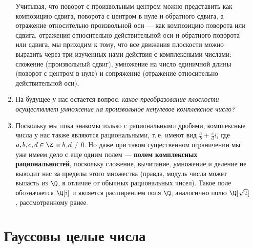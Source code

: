 \begin{enumerate}
Учитывая, что поворот с произвольным центром можно представить как композицию сдвига, поворота с центром в нуле и обратного сдвига, а отражение относительно произвольной оси --- как композицию поворота или сдвига, отражения относительно действительной оси и обратного поворота или сдвига, мы приходим к тому, что все движения плоскости можно выразить через три изученных нами действия с комплексными числами: сложение (произвольный сдвиг), умножение на число единичной длины (поворот с центром в нуле) и сопряжение (отражение относительно действительной оси).
\item На будущее у нас остается вопрос: \textit{какое преобразование плоскости осуществляет умножение на произвольное ненулевое комплексное число?}
\item Поскольку мы пока знакомы только с рациональными дробями, комплексные числа у нас также являются рациональными, т.\,е. имеют вид $\frac{a}{b}+\frac{c}{d}i$, где $a,b,c,d\in\Z$ и $b,d\ne 0$. Но даже при таком существенном ограничении мы уже имеем дело с еще одним полем --- \textbf{полем комплексных рациональностей}, поскольку сложение, вычитание, умножение и деление не выводит нас за пределы этого множества (правда, модуль числа может выпасть из $\Q$, в отличие от обычных рациональных чисел). Такое поле обозначается $\Q[i]$ и является расширением поля $\Q$, аналогично полю $\Q[\sqrt 2]$, рассмотренному ранее.
\end{enumerate}



\section{Гауссовы целые числа}


